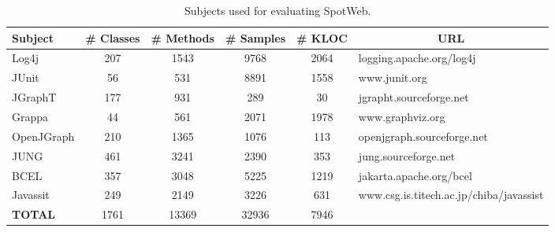 \documentclass[conference]{IEEEtran}
\newcommand{\Comment}[1]{}
\newenvironment{CodeOut}{\begin{small}}{\end{small}}
\newcommand{\CenterCell}[1]{\multicolumn{1}{c|}{#1}}
\begin{document}
\setlength{\tabcolsep}{1pt}
\begin{table}[t]
\begin{CodeOut}
\begin{center}
\centering \caption {\label{tab:subjects} Subjects used for evaluating SpotWeb.}
\begin {tabular} {|l|c|c|c|c|l|}
\hline
Subject&\# Classes&\# Methods&\# Samples&\# KLOC&\CenterCell{URL}\\
\hline Log4j&207&1543&9768&2064&logging.apache.org/log4j\\
\hline JUnit&56&531&8891&1558&www.junit.org\\
\hline JGraphT&177&931&289&30&jgrapht.sourceforge.net\\
\hline Grappa&44&561&2071&1978&www.graphviz.org\\
\hline OpenJGraph&210&1365&1076&113&openjgraph.sourceforge.net\\
\hline JUNG&461&3241&2390&353&jung.sourceforge.net\\
\hline BCEL&357&3048&5225&1219&jakarta.apache.org/bcel\\
\hline Javassit&249&2149&3226&631&www.csg.is.titech.ac.jp/chiba/javassist\\
\hline \textbf{TOTAL}&1761&13369&32936&7946&\\
\hline
\end{tabular}
\end{center}
\end{CodeOut}
\end{table}
\Comment{%
\subsection{Subjects}
\label{sec:subjects}
Log4j is a library used for inserting
logs in source code. JUnit is the
\emph{de facto} standard unit testing framework for the Java
programming language. JGraphT, Grappa, OpenJGraph, and JUNG are four
graph libraries that provide several graph manipulation utilities.
BCEL and Javassit are libraries that provide functionality for
creating, analyzing, and manipulating Java class files.
}
\end{document}

